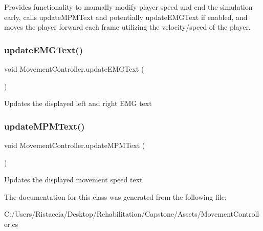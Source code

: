Provides functionality to manually modify player speed and end the simulation early, calls update\+M\+P\+M\+Text and potentially update\+E\+M\+G\+Text if enabled, and moves the player forward each frame utilizing the velocity/speed of the player. \mbox{\label{class_movement_controller_afd47400566c9ec385c6cb19574de283e}} 
\subsubsection{\texorpdfstring{update\+E\+M\+G\+Text()}{updateEMGText()}}
{\footnotesize\ttfamily void Movement\+Controller.\+update\+E\+M\+G\+Text (\begin{DoxyParamCaption}{ }\end{DoxyParamCaption})\hspace{0.3cm}{\ttfamily [private]}}

Updates the displayed left and right E\+MG text \mbox{\label{class_movement_controller_abe71887d2658d9031b2b11ae2f48f810}} 
\subsubsection{\texorpdfstring{update\+M\+P\+M\+Text()}{updateMPMText()}}
{\footnotesize\ttfamily void Movement\+Controller.\+update\+M\+P\+M\+Text (\begin{DoxyParamCaption}{ }\end{DoxyParamCaption})\hspace{0.3cm}{\ttfamily [private]}}

Updates the displayed movement speed text 

The documentation for this class was generated from the following file\+:\begin{DoxyCompactItemize}
\item 
C\+:/\+Users/\+Ristaccia/\+Desktop/\+Rehabilitation/\+Capstone/\+Assets/Movement\+Controller.\+cs\end{DoxyCompactItemize}
